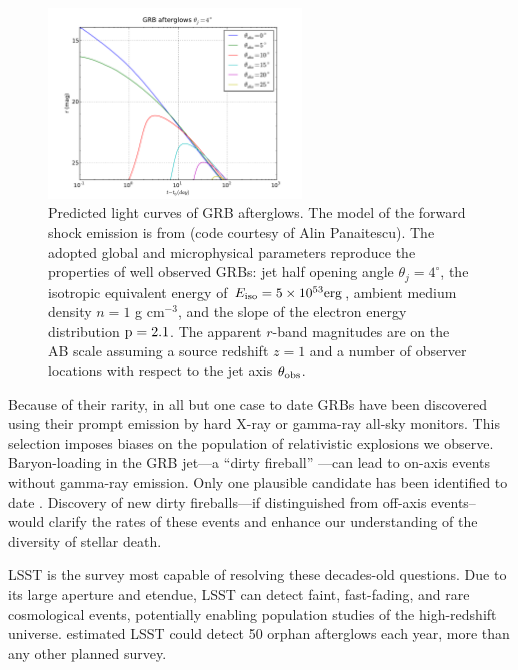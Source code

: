 \begin{figure}[hbt]
\centerline{
\includegraphics[width=0.6\textwidth]{figs/transients/predicted_afterglow_lcs_mag.pdf}
}
\caption{
Predicted light curves of GRB afterglows. The model of the forward shock emission is from \citealt{2002ApJ...576..120T}
(code courtesy of Alin Panaitescu). The adopted global and microphysical parameters reproduce the properties
of well observed GRBs:
jet half opening angle $\theta_j = 4^\circ$, the isotropic equivalent energy of $E_{\rm iso} = 5\times10^{53} \rm erg$,
ambient medium density $n = 1$ g cm$^{-3}$, and the slope of the electron energy distribution $\rm p = 2.1$.
The apparent $r$-band magnitudes are on the AB scale assuming a source redshift $z = 1$ and a number
of observer locations with respect to the jet axis $\theta_{\rm obs}$.
}
\label{fig:afterglow_lcs}
\end{figure}

Because of their rarity, in all but one case \citep{2015ApJ...803L..24C} to date GRBs have been discovered using their prompt emission by hard X-ray or gamma-ray all-sky monitors.  
This selection imposes biases on the population of relativistic explosions we observe.  
Baryon-loading in the GRB jet---a ``dirty fireball'' \citep{2003ApJ...591.1097R}---can lead to on-axis events without gamma-ray emission.  Only one plausible candidate has been identified to date \citep{2013ApJ...769..130C}.  
Discovery of new dirty fireballs---if distinguished from off-axis events--would clarify the rates of these events and enhance our understanding of the diversity of stellar death.

LSST is the survey most capable of resolving these decades-old questions.  Due to its large aperture and etendue, LSST can detect faint, fast-fading, and rare cosmological events, potentially enabling population studies of the high-redshift universe.  
\citet{2015A&A...578A..71G} estimated LSST could detect 50 orphan afterglows each year, more than any other planned survey.

